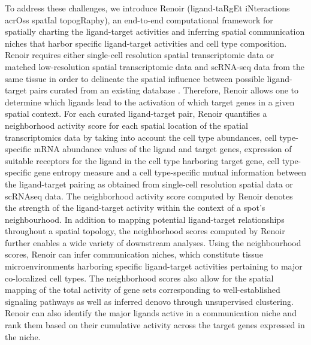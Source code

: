To address these challenges, we introduce Renoir (ligand-taRgEt iNteractions acrOss spatIal topogRaphy), an end-to-end computational framework for spatially charting the ligand-target activities and inferring spatial communication niches that harbor specific ligand-target activities and cell type composition. Renoir requires either single-cell resolution spatial transcriptomic data or matched low-resolution spatial transcriptomic data and scRNA-seq data from the same tissue in order to delineate the spatial influence between possible ligand-target pairs curated from an existing database \citep{Browaeys2020}. Therefore, Renoir allows one to determine which ligands lead to the activation of which target genes in a given spatial context. For each curated ligand-target pair, Renoir quantifies a neighborhood activity score for each spatial location of the spatial transcriptomics data by taking into account the cell type abundances, cell type-specific mRNA abundance values of the ligand and target genes, expression of suitable receptors for the ligand in the cell type harboring target gene, cell type-specific gene entropy measure and a cell type-specific mutual information between the ligand-target pairing as obtained from single-cell resolution spatial data or scRNAseq data. The neighborhood activity score computed by Renoir denotes the strength of the ligand-target activity within the context of a spot’s neighbourhood. In addition to mapping potential ligand-target relationships throughout a spatial topology, the neighborhood scores computed by Renoir further enables a wide variety of downstream analyses. Using the neighbourhood scores, Renoir can infer communication niches, which constitute tissue microenvironments harboring specific ligand-target activities pertaining to major co-localized cell types. The neighborhood scores also allow for the spatial mapping of the total activity of gene sets corresponding to well-established signaling pathways as well as inferred denovo through unsupervised clustering. Renoir can also identify the major ligands active in a communication niche and rank them based on their cumulative activity across the target genes expressed in the niche. \par 


